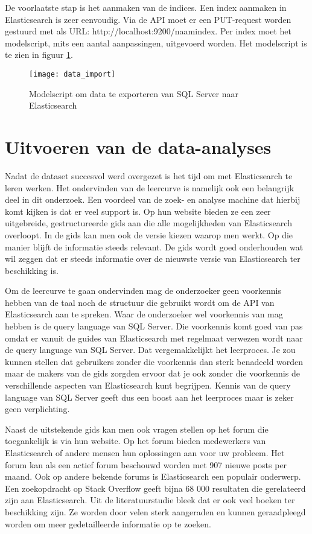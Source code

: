 De voorlaatste stap is het aanmaken van de indices. Een index aanmaken in Elasticsearch is zeer eenvoudig. Via de API moet er een PUT-request worden gestuurd met als URL: http://localhost:9200/naam\textunderscore index.
Per index moet het modelscript, mits een aantal aanpassingen, uitgevoerd worden. Het modelscript is te zien in figuur \ref{fig:data_import}.

\begin{figure}
	\centering
	\texttt{[image: data\_import]}
	\caption{Modelscript om data te exporteren van SQL Server naar Elasticsearch}
	\label{fig:data_import}
\end{figure}

\section{Uitvoeren van de data-analyses}
Nadat de dataset succesvol werd overgezet is het tijd om met Elasticsearch te leren werken. Het ondervinden van de leercurve is namelijk ook een belangrijk deel in dit onderzoek. Een voordeel van de zoek- en analyse machine dat hierbij komt kijken is dat er veel support is. Op hun website bieden ze een zeer uitgebreide, gestructureerde gids aan die alle mogelijkheden van Elasticsearch overloopt. In de gids kan men ook de versie kiezen waarop men werkt. Op die manier blijft de informatie steeds relevant. De gids wordt goed onderhouden wat wil zeggen dat er steeds informatie over de nieuwste versie van Elasticsearch ter beschikking is. 

Om de leercurve te gaan ondervinden mag de onderzoeker geen voorkennis hebben van de taal noch de structuur die gebruikt wordt om de API van Elasticsearch aan te spreken. Waar de onderzoeker wel voorkennis van mag hebben is de query language van SQL Server. Die voorkennis komt goed van pas omdat er vanuit de guides van Elasticsearch met regelmaat verwezen wordt naar de query language van SQL Server. Dat vergemakkelijkt het leerproces. Je zou kunnen stellen dat gebruikers zonder die voorkennis dan sterk benadeeld worden maar de makers van de gids zorgden ervoor dat je ook zonder die voorkennis de verschillende aspecten van Elasticsearch kunt begrijpen. Kennis van de query language van SQL Server geeft dus een boost aan het leerproces maar is zeker geen verplichting.

Naast de uitstekende gids kan men ook vragen stellen op het forum die toegankelijk is via hun website. Op het forum bieden medewerkers van Elasticsearch of andere mensen hun oplossingen aan voor uw probleem. Het forum kan als een actief forum beschouwd worden met 907 nieuwe posts per maand. Ook op andere bekende forums is Elasticsearch een populair onderwerp. Een zoekopdracht op Stack Overflow geeft bijna 68 000 resultaten die gerelateerd zijn aan Elasticsearch. Uit de literatuurstudie bleek dat er ook veel boeken ter beschikking zijn. Ze worden door velen sterk aangeraden en kunnen geraadpleegd worden om meer gedetailleerde informatie op te zoeken. 


